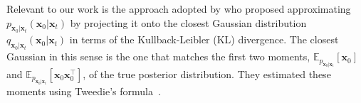 Relevant to our work is the approach adopted by \citet{boys2024} who proposed approximating $ p_{\mathbf{x}_0|\mathbf{x}_t}(\mathbf{x}_0|\mathbf{x}_t) $ by projecting it onto the closest Gaussian distribution $ q_{\mathbf{x}_0|\mathbf{x}_t}(\mathbf{x}_0|\mathbf{x}_t) $ in terms of the Kullback-Leibler (KL) divergence. The closest Gaussian in this sense is the one that matches the first two moments, $\mathbb{E}_{p_{\mathbf{x}_0|\mathbf{x}_t}}[\mathbf{x}_0]$ and $\mathbb{E}_{p_{\mathbf{x}_0|\mathbf{x}_t}}[\mathbf{x}_0 \mathbf{x}_0^\top]$,  of the true posterior distribution. They estimated these moments using Tweedie's formula~\cite{Efron2011}.  